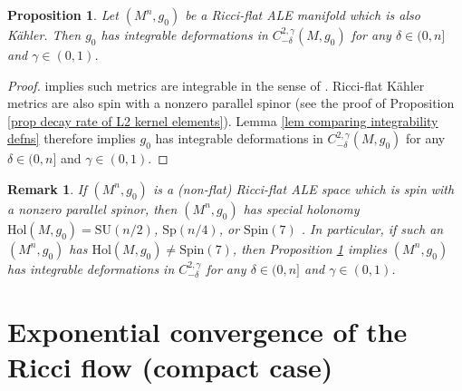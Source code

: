 \documentclass[12pt]{amsart}
\renewcommand{\1}{{\mathbf 1}}
\newtheorem{prop}[thm]{Proposition}
\theoremstyle{others}
\newtheorem{rmk}[thm]{Remark}
\numberwithin{equation}{section}
\begin{document}
\begin{prop} \label{prop Calabi-Yau implies integrable}
    Let $(M^n, g_0)$ be a Ricci-flat ALE manifold which is also K{\"a}hler.
    Then $g_0$ has integrable deformations in $C^{2, \gamma}_{-\delta}(M, g_0)$ for any $\delta \in (0, n]$ and $\gamma \in (0,1)$.
\end{prop}
\begin{proof}
    \cite[Theorem 2.18]{DeruelleKroncke20} implies such metrics are integrable in the sense of \cite[Definition 2.14]{DeruelleKroncke20}.
    Ricci-flat K{\"a}hler metrics are also spin with a nonzero parallel spinor (see the proof of Proposition \ref{prop decay rate of L2 kernel elements}).
    Lemma \ref{lem comparing integrability defns} therefore implies $g_0$ has integrable deformations in $C^{2, \gamma}_{-\delta}(M, g_0)$ for any $\delta \in (0, n]$ and $\gamma \in (0,1)$.
\end{proof}

\begin{rmk}
    If $(M^n, g_0)$ is a (non-flat) Ricci-flat ALE space which is spin with a nonzero parallel spinor, then $(M^n, g_0)$ has special holonomy $\text{Hol}(M, g_0) = \text{SU}(n/2)$, $\text{Sp}(n/4)$, or $\text{Spin}(7)$ \cite[Section 6]{KronckePetersen22}.
    In particular, if such an $(M^n, g_0)$ has $\text{Hol}(M, g_0) \ne \text{Spin}(7)$, then Proposition \ref{prop Calabi-Yau implies integrable} implies $(M^n, g_0)$ has integrable deformations in $C^{2, \gamma}_{-\delta}$ for any $\delta \in (0, n]$ and $\gamma \in (0,1)$.
\end{rmk}



\vspace{10mm}



\section{Exponential convergence of the Ricci flow (compact case)}\label{s:exponentialconvergence}
\end{document}
